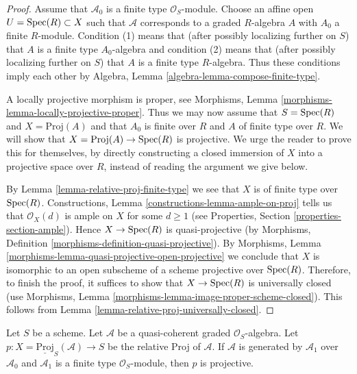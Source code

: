 \begin{proof}
Assume that $\mathcal{A}_0$ is a finite type $\mathcal{O}_S$-module.
Choose an affine open $U = \mathop{\mathrm{Spec}}(R) \subset X$ such that $\mathcal{A}$
corresponds to a graded $R$-algebra $A$ with $A_0$ a finite $R$-module.
Condition (1) means that (after possibly localizing further on $S$)
that $A$ is a finite type $A_0$-algebra and condition (2) means that
(after possibly localizing further on $S$) that $A$ is a finite type
$R$-algebra. Thus these conditions imply each other by
Algebra, Lemma \ref{algebra-lemma-compose-finite-type}.

\medskip\noindent
A locally projective morphism is proper, see
Morphisms, Lemma \ref{morphisms-lemma-locally-projective-proper}.
Thus we may now assume that $S = \mathop{\mathrm{Spec}}(R)$ and $X = \text{Proj}(A)$
and that $A_0$ is finite over $R$ and $A$ of finite type over $R$.
We will show that $X = \text{Proj}(A) \to \mathop{\mathrm{Spec}}(R)$ is projective.
We urge the reader to prove this for themselves, by directly constructing
a closed immersion of $X$ into a projective space over $R$, instead
of reading the argument we give below.

\medskip\noindent
By Lemma \ref{lemma-relative-proj-finite-type}
we see that $X$ is of finite type over $\mathop{\mathrm{Spec}}(R)$.
Constructions, Lemma \ref{constructions-lemma-ample-on-proj}
tells us that $\mathcal{O}_X(d)$ is ample on $X$ for some $d \geq 1$
(see Properties, Section \ref{properties-section-ample}).
Hence $X \to \mathop{\mathrm{Spec}}(R)$ is quasi-projective (by
Morphisms, Definition \ref{morphisms-definition-quasi-projective}).
By Morphisms, Lemma \ref{morphisms-lemma-quasi-projective-open-projective}
we conclude that $X$ is isomorphic to an open subscheme of a scheme
projective over $\mathop{\mathrm{Spec}}(R)$. Therefore, to finish the proof, it suffices
to show that $X \to \mathop{\mathrm{Spec}}(R)$ is universally closed (use
Morphisms, Lemma \ref{morphisms-lemma-image-proper-scheme-closed}).
This follows from Lemma \ref{lemma-relative-proj-universally-closed}.
\end{proof}

\begin{lemma}
\label{lemma-relative-proj-projective}
Let $S$ be a scheme. Let $\mathcal{A}$ be a quasi-coherent graded
$\mathcal{O}_S$-algebra. Let
$p : X = \underline{\text{Proj}}_S(\mathcal{A}) \to S$ be the relative
Proj of $\mathcal{A}$. If $\mathcal{A}$ is generated by
$\mathcal{A}_1$ over $\mathcal{A}_0$ and $\mathcal{A}_1$
is a finite type $\mathcal{O}_S$-module, then $p$ is projective.
\end{lemma}

